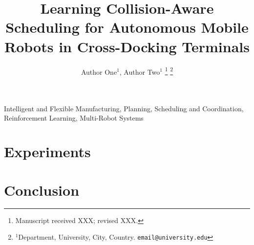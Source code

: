 \documentclass[journal]{IEEEtran}
\begin{document}
\title{Learning Collision-Aware Scheduling for Autonomous Mobile Robots
in Cross-Docking Terminals}

\author{%
  Author One$^{1}$, Author Two$^{1}$%
  \thanks{Manuscript received XXX; revised XXX.}%
  \thanks{$^{1}$Department, University, City, Country.
    {\tt\small email@university.edu}}%
}

\maketitle

\begin{abstract}
\CDGNNabstract
\end{abstract}

\begin{IEEEkeywords}
Intelligent and Flexible Manufacturing, Planning, Scheduling and
Coordination, Reinforcement Learning, Multi-Robot Systems
\end{IEEEkeywords}



\section{Experiments}
\label{sec:experiments}

\section{Conclusion}
\label{sec:conclusion}



\end{document}
